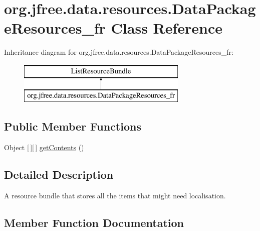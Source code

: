 \hypertarget{classorg_1_1jfree_1_1data_1_1resources_1_1_data_package_resources__fr}{}\section{org.\+jfree.\+data.\+resources.\+Data\+Package\+Resources\+\_\+fr Class Reference}
\label{classorg_1_1jfree_1_1data_1_1resources_1_1_data_package_resources__fr}
Inheritance diagram for org.\+jfree.\+data.\+resources.\+Data\+Package\+Resources\+\_\+fr\+:\begin{figure}[H]
\begin{center}
\leavevmode
\includegraphics[height=2.000000cm]{classorg_1_1jfree_1_1data_1_1resources_1_1_data_package_resources__fr}
\end{center}
\end{figure}
\subsection*{Public Member Functions}
\begin{DoxyCompactItemize}
\item 
Object \mbox{[}$\,$\mbox{]}\mbox{[}$\,$\mbox{]} \mbox{\hyperlink{classorg_1_1jfree_1_1data_1_1resources_1_1_data_package_resources__fr_af82b4c688f347eba8f7666b53e12cb64}{get\+Contents}} ()
\end{DoxyCompactItemize}


\subsection{Detailed Description}
A resource bundle that stores all the items that might need localisation. 

\subsection{Member Function Documentation}
\mbox{\label{classorg_1_1jfree_1_1data_1_1resources_1_1_data_package_resources__fr_af82b4c688f347eba8f7666b53e12cb64}} 
